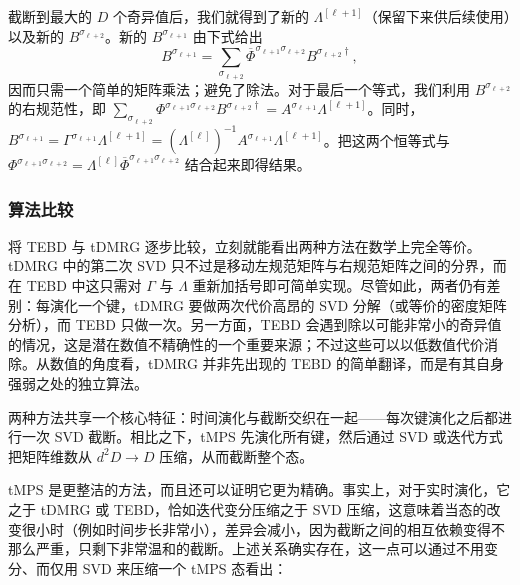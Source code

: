 截断到最大的 $D$ 个奇异值后，我们就得到了新的 $\Lambda^{[\ell+1]}$（保留下来供后续使用）以及新的 $B^{\sigma_{\ell+2}}$。新的 $B^{\sigma_{\ell+1}}$
由下式给出
\begin{equation}
B^{\sigma_{\ell+1}} = \sum_{\sigma_{\ell+2}}  \overline{\Phi}^{\sigma_{\ell+1}\sigma_{\ell+2}}
B^{\sigma_{\ell+2}\dagger},
\end{equation}
因而只需一个简单的矩阵乘法；避免了除法。对于最后一个等式，我们利用 $B^{\sigma_{\ell+2}}$ 的右规范性，即 $\sum_{\sigma_{\ell+2}} \Phi^{\sigma_{\ell+1}\sigma_{\ell+2}} B^{\sigma_{\ell+2}\dagger} =  A^{\sigma_{\ell+1}} \Lambda^{[\ell+1]}$。同时，$B^{\sigma_{\ell+1}} = \Gamma^{\sigma_{\ell+1}} \Lambda^{[\ell+1]} = (\Lambda^{[\ell]})^{-1} A^{\sigma_{\ell+1}}  \Lambda^{[\ell+1]}$。把这两个恒等式与 $\Phi^{\sigma_{\ell+1} \sigma_{\ell+2}} = \Lambda^{[\ell]} \overline{\Phi}^{\sigma_{\ell+1} \sigma_{\ell+2}}$ 结合起来即得结果。

\subsubsection{算法比较}
将 TEBD 与 tDMRG 逐步比较，立刻就能看出两种方法在数学上完全等价。tDMRG 中的第二次 SVD 只不过是移动左规范矩阵与右规范矩阵之间的分界，而在 TEBD 中这只需对 $\Gamma$ 与 $\Lambda$ 重新加括号即可简单实现。尽管如此，两者仍有差别：每演化一个键，tDMRG 要做两次代价高昂的 SVD 分解（或等价的密度矩阵分析），而 TEBD 只做一次。另一方面，TEBD 会遇到除以可能非常小的奇异值的情况，这是潜在数值不精确性的一个重要来源；不过这些可以\cite{Hastings09}以低数值代价消除。从数值的角度看，tDMRG 并非先出现的 TEBD 的简单翻译，而是有其自身强弱之处的独立算法。

两种方法共享一个核心特征：时间演化与截断交织在一起——每次键演化之后都进行一次 SVD 截断。相比之下，tMPS 先演化所有键，然后通过 SVD 或迭代方式把矩阵维数从 $d^2 D \rightarrow D$ 压缩，从而截断整个态。 

tMPS 是更整洁的方法，而且还可以证明它更为精确。事实上，对于实时演化，它之于 tDMRG 或 TEBD，恰如迭代变分压缩之于 SVD 压缩，这意味着当态的改变很小时（例如时间步长非常小），差异会减小，因为截断之间的相互依赖变得不那么严重，只剩下非常温和的截断。上述关系确实存在，这一点可以通过不用变分、而仅用 SVD 来压缩一个 tMPS 态看出： 

